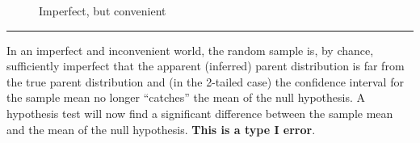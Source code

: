 \documentclass[
  letterpaper,
  DIV=11,
  numbers=noendperiod]{scrreprt}
\begin{document}
\begin{figure}


\caption{\label{fig-5-5.sample_imperfect_convenient}Imperfect, but
convenient}

\end{figure}%

\begin{center}\rule{0.5\linewidth}{0.5pt}\end{center}

In an imperfect and inconvenient world, the random sample is, by chance,
sufficiently imperfect that the apparent (inferred) parent distribution
is far from the true parent distribution and (in the 2-tailed case) the
confidence interval for the sample mean no longer ``catches'' the mean
of the null hypothesis. A hypothesis test will now find a significant
difference between the sample mean and the mean of the null hypothesis.
\textbf{This is a type I error}.
\end{document}
